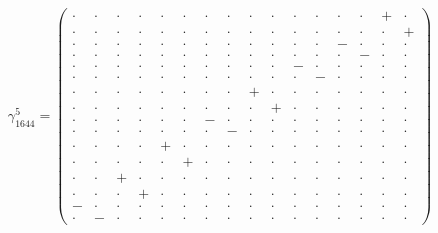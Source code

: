 \documentclass[
  10pt,
]{article}
\begin{document}
\[\gamma_{1644}^5=\left(\begin{smallmatrix} \cdot & \cdot & \cdot & \cdot & \cdot & \cdot & \cdot & \cdot & \cdot & \cdot & \cdot & \cdot & \cdot & \cdot & + & \cdot \\ \cdot & \cdot & \cdot & \cdot & \cdot & \cdot & \cdot & \cdot & \cdot & \cdot & \cdot & \cdot & \cdot & \cdot & \cdot & + \\ \cdot & \cdot & \cdot & \cdot & \cdot & \cdot & \cdot & \cdot & \cdot & \cdot & \cdot & \cdot & - & \cdot & \cdot & \cdot \\ \cdot & \cdot & \cdot & \cdot & \cdot & \cdot & \cdot & \cdot & \cdot & \cdot & \cdot & \cdot & \cdot & - & \cdot & \cdot \\ \cdot & \cdot & \cdot & \cdot & \cdot & \cdot & \cdot & \cdot & \cdot & \cdot & - & \cdot & \cdot & \cdot & \cdot & \cdot \\ \cdot & \cdot & \cdot & \cdot & \cdot & \cdot & \cdot & \cdot & \cdot & \cdot & \cdot & - & \cdot & \cdot & \cdot & \cdot \\ \cdot & \cdot & \cdot & \cdot & \cdot & \cdot & \cdot & \cdot & + & \cdot & \cdot & \cdot & \cdot & \cdot & \cdot & \cdot \\ \cdot & \cdot & \cdot & \cdot & \cdot & \cdot & \cdot & \cdot & \cdot & + & \cdot & \cdot & \cdot & \cdot & \cdot & \cdot \\ \cdot & \cdot & \cdot & \cdot & \cdot & \cdot & - & \cdot & \cdot & \cdot & \cdot & \cdot & \cdot & \cdot & \cdot & \cdot \\ \cdot & \cdot & \cdot & \cdot & \cdot & \cdot & \cdot & - & \cdot & \cdot & \cdot & \cdot & \cdot & \cdot & \cdot & \cdot \\ \cdot & \cdot & \cdot & \cdot & + & \cdot & \cdot & \cdot & \cdot & \cdot & \cdot & \cdot & \cdot & \cdot & \cdot & \cdot \\ \cdot & \cdot & \cdot & \cdot & \cdot & + & \cdot & \cdot & \cdot & \cdot & \cdot & \cdot & \cdot & \cdot & \cdot & \cdot \\ \cdot & \cdot & + & \cdot & \cdot & \cdot & \cdot & \cdot & \cdot & \cdot & \cdot & \cdot & \cdot & \cdot & \cdot & \cdot \\ \cdot & \cdot & \cdot & + & \cdot & \cdot & \cdot & \cdot & \cdot & \cdot & \cdot & \cdot & \cdot & \cdot & \cdot & \cdot \\ - & \cdot & \cdot & \cdot & \cdot & \cdot & \cdot & \cdot & \cdot & \cdot & \cdot & \cdot & \cdot & \cdot & \cdot & \cdot \\ \cdot & - & \cdot & \cdot & \cdot & \cdot & \cdot & \cdot & \cdot & \cdot & \cdot & \cdot & \cdot & \cdot & \cdot & \cdot \end{smallmatrix}\right)\]
\end{document}
